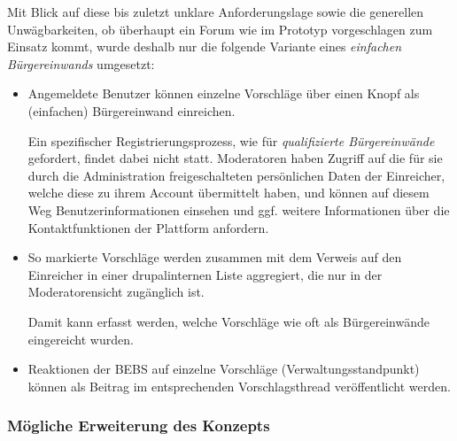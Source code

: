 \documentclass[11pt,a4paper,twoside]{article}
\begin{document}
Mit Blick auf diese bis zuletzt unklare Anforderungslage sowie die generellen
Unwägbarkeiten, ob überhaupt ein Forum wie im Prototyp vorgeschlagen zum
Einsatz kommt, wurde deshalb nur die folgende Variante eines \emph{einfachen
  Bürgereinwands} umgesetzt:
\begin{itemize}
\item Angemeldete Benutzer können einzelne Vorschläge über einen Knopf als
  (einfachen) Bürgereinwand einreichen. 
  
  Ein spezifischer Registrierungsprozess, wie für \emph{qualifizierte
    Bürgereinwände} gefordert, findet dabei nicht statt. Moderatoren haben
  Zugriff auf die für sie durch die Administration freigeschalteten
  persönlichen Daten der Einreicher, welche diese zu ihrem Account übermittelt
  haben, und können auf diesem Weg Benutzerinformationen einsehen und
  ggf. weitere Informationen über die Kontaktfunktionen der Plattform
  anfordern. 

\item So markierte Vorschläge werden zusammen mit dem Verweis auf den
  Einreicher in einer drupalinternen Liste aggregiert, die nur in der
  Moderatorensicht zugänglich ist.

  Damit kann erfasst werden, welche Vorschläge wie oft als Bürgereinwände
  eingereicht wurden.

\item Reaktionen der BEBS auf einzelne Vorschläge (Verwaltungsstandpunkt)
  können als Beitrag im entsprechenden Vorschlagsthread veröffentlicht werden.
\end{itemize}

\subsubsection*{Mögliche Erweiterung des Konzepts} 
\end{document}
